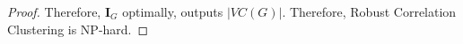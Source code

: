 \begin{proof}

Therefore, $\mathbf{I}_G$ optimally, outputs $|VC(G)|$. Therefore, Robust Correlation Clustering is NP-hard.


\end{proof}